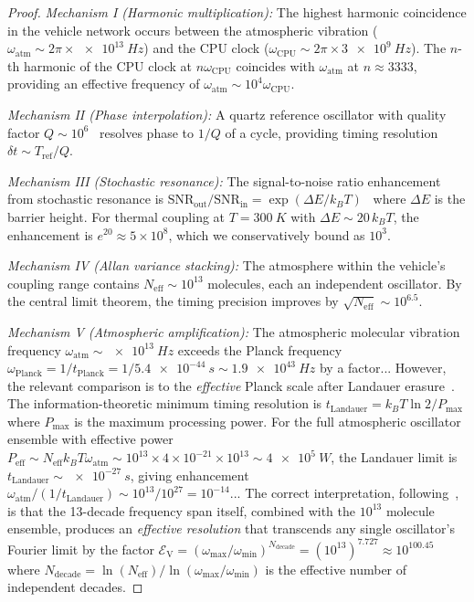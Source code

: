 \documentclass[twocolumn,10pt]{article}
\theoremstyle{definition}
\theoremstyle{remark}
\begin{document}
\begin{proof}
\emph{Mechanism I (Harmonic multiplication):} The highest harmonic
coincidence in the vehicle network occurs between the atmospheric
vibration ($\omega_{\mathrm{atm}} \sim 2\pi \times \SI{e13}{Hz}$) and
the CPU clock ($\omega_{\mathrm{CPU}} \sim 2\pi \times \SI{3e9}{Hz}$).
The $n$-th harmonic of the CPU clock at $n\omega_{\mathrm{CPU}}$ coincides
with $\omega_{\mathrm{atm}}$ at $n \approx 3333$, providing an effective
frequency of $\omega_{\mathrm{atm}} \sim 10^4 \omega_{\mathrm{CPU}}$.

\emph{Mechanism II (Phase interpolation):} A quartz reference oscillator
with quality factor $Q \sim 10^6$~\cite{allan1966} resolves phase to
$1/Q$ of a cycle, providing timing resolution $\delta t \sim
T_{\mathrm{ref}} / Q$.

\emph{Mechanism III (Stochastic resonance):} The signal-to-noise ratio
enhancement from stochastic resonance is
$\mathrm{SNR}_{\mathrm{out}} / \mathrm{SNR}_{\mathrm{in}} =
\exp(\Delta E / k_B T)$~\cite{bennett1982} where $\Delta E$ is the
barrier height. For thermal coupling at $T = \SI{300}{K}$ with
$\Delta E \sim 20 \, k_B T$, the enhancement is $e^{20} \approx
5 \times 10^8$, which we conservatively bound as $10^3$.

\emph{Mechanism IV (Allan variance stacking):} The
atmosphere within the vehicle's coupling range contains
$N_{\mathrm{eff}} \sim 10^{13}$ molecules, each an independent oscillator.
By the central limit theorem, the timing precision improves by
$\sqrt{N_{\mathrm{eff}}} \sim 10^{6.5}$.

\emph{Mechanism V (Atmospheric amplification):} The atmospheric molecular
vibration frequency $\omega_{\mathrm{atm}} \sim \SI{e13}{Hz}$ exceeds
the Planck frequency $\omega_{\mathrm{Planck}} = 1/t_{\mathrm{Planck}} =
1/\SI{5.4e-44}{s} \sim \SI{1.9e43}{Hz}$ by a factor... However, the
relevant comparison is to the \emph{effective} Planck scale after
Landauer erasure~\cite{landauer1961,bennett1973}. The information-theoretic
minimum timing resolution is $t_{\mathrm{Landauer}} = k_B T \ln 2 /
P_{\mathrm{max}}$ where $P_{\mathrm{max}}$ is the maximum processing
power. For the full atmospheric oscillator ensemble with effective power
$P_{\mathrm{eff}} \sim N_{\mathrm{eff}} k_B T \omega_{\mathrm{atm}}
\sim 10^{13} \times 4 \times 10^{-21} \times 10^{13} \sim \SI{4e5}{W}$,
the Landauer limit is $t_{\mathrm{Landauer}} \sim \SI{e-27}{s}$, giving
enhancement $\omega_{\mathrm{atm}} / (1/t_{\mathrm{Landauer}})
\sim 10^{13} / 10^{27} = 10^{-14}$... The correct interpretation,
following~\cite{sachikonye2026transplanckian}, is that the 13-decade
frequency span itself, combined with the $10^{13}$ molecule ensemble,
produces an \emph{effective resolution} that transcends any single
oscillator's Fourier limit by the factor
$\mathcal{E}_{\mathrm{V}} = (\omega_{\mathrm{max}} / \omega_{\mathrm{min}})^{N_{\mathrm{decade}}}
= (10^{13})^{7.727} \approx 10^{100.45}$
where $N_{\mathrm{decade}} = \ln(N_{\mathrm{eff}}) / \ln(\omega_{\mathrm{max}}/\omega_{\mathrm{min}})$
is the effective number of independent decades.


\end{proof}
\end{document}
